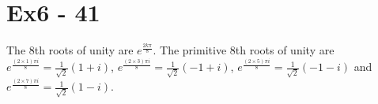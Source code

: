 \section*{Ex6 - 41}
The 8th roots of unity are $ e^{\frac{2k\pi}{8}} $. The primitive 8th roots of unity are $ e^{\frac{(2 \times 1) \pi i}{8}} = \frac{1}{\sqrt{2}}( 1 + i) $, $ e^{\frac{(2 \times 3) \pi i}{8}} = \frac{1}{\sqrt{2}}(-1 + i) $, $ e^{\frac{(2 \times 5) \pi i}{8}} = \frac{1}{\sqrt{2}}(-1 - i) $ and $ e^{\frac{(2 \times 7) \pi i}{8}} = \frac{1}{\sqrt{2}}( 1 - i) $.